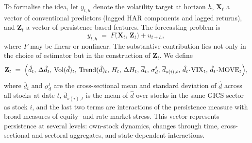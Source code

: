 \documentclass[11pt,a4paper]{article}
\newcommand{\VIX}{\mathrm{VIX}}
\newcommand{\dhat}{\hat d}
\begin{document}
To formalise the idea, let $y_{t,h}$ denote the volatility target at
horizon $h$, $\mathbf X_t$ a vector of conventional predictors (lagged
HAR components and lagged returns), and $\mathbf Z_t$ a vector of
persistence-based features. The forecasting problem is
\begin{equation}
  y_{t,h} \;=\; F\!\bigl(\mathbf X_t,\, \mathbf Z_t\bigr) + u_{t+h},
\end{equation}
where $F$ may be linear or nonlinear. The substantive contribution lies
not only in the choice of estimator but in the construction of
$\mathbf Z_t$. We define
\begin{equation}
\mathbf Z_t \;=\; \Bigl(
  \dhat_t,\,\Delta\dhat_t,\,\mathrm{Vol}(\dhat)_t,\,\mathrm{Trend}(\dhat)_t,\,
  H_t,\,\Delta H_t,\,
  \overline{d}_t,\,\sigma_d^t,\,\overline{d}_{s(i),t},\,
  \dhat_t\!\cdot\!\VIX_t,\,\dhat_t\!\cdot\!\mathrm{MOVE}_t
\Bigr),
\end{equation}
where $\overline d_t$ and $\sigma_d^t$ are the cross-sectional mean and
standard deviation of $\dhat$ across all stocks at date $t$,
$\overline d_{s(i),t}$ is the mean of $\dhat$ over stocks in the same
GICS sector as stock $i$, and the last two terms are interactions of the
persistence measure with broad measures of equity- and rate-market
stress. This vector represents persistence at several levels: own-stock
dynamics, changes through time, cross-sectional and sectoral
aggregates, and state-dependent interactions.
\end{document}
